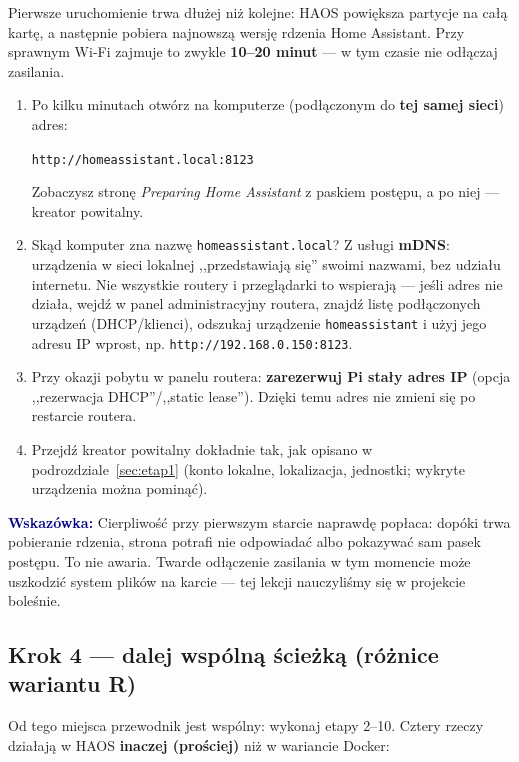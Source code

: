 \documentclass[11pt,a4paper]{article}
\newcommand{\wskazowka}[1]{\par\medskip\noindent\textcolor{navy}{\textbf{Wskazówka:}} #1\par\medskip}
\begin{document}
Pierwsze uruchomienie trwa dłużej niż kolejne: HAOS powiększa partycje na całą kartę, a następnie pobiera najnowszą wersję rdzenia Home Assistant. Przy sprawnym Wi-Fi zajmuje to zwykle \textbf{10--20 minut} --- w tym czasie nie odłączaj zasilania.

\begin{enumerate}
\item Po kilku minutach otwórz na komputerze (podłączonym do \textbf{tej samej sieci}) adres:
\begin{center}\Large\texttt{http://homeassistant.local:8123}\end{center}
Zobaczysz stronę \emph{Preparing Home Assistant} z paskiem postępu, a po niej --- kreator powitalny.
\item Skąd komputer zna nazwę \texttt{homeassistant.local}? Z usługi \textbf{mDNS}: urządzenia w sieci lokalnej ,,przedstawiają się'' swoimi nazwami, bez udziału internetu. Nie wszystkie routery i przeglądarki to wspierają --- jeśli adres nie działa, wejdź w panel administracyjny routera, znajdź listę podłączonych urządzeń (DHCP/klienci), odszukaj urządzenie \texttt{homeassistant} i użyj jego adresu IP wprost, np. \texttt{http://192.168.0.150:8123}.
\item Przy okazji pobytu w panelu routera: \textbf{zarezerwuj Pi stały adres IP} (opcja ,,rezerwacja DHCP''/,,static lease''). Dzięki temu adres nie zmieni się po restarcie routera.
\item Przejdź kreator powitalny dokładnie tak, jak opisano w podrozdziale~\ref{sec:etap1} (konto lokalne, lokalizacja, jednostki; wykryte urządzenia można pominąć).
\end{enumerate}

\wskazowka{Cierpliwość przy pierwszym starcie naprawdę popłaca: dopóki trwa pobieranie rdzenia, strona potrafi nie odpowiadać albo pokazywać sam pasek postępu. To nie awaria. Twarde odłączenie zasilania w tym momencie może uszkodzić system plików na karcie --- tej lekcji nauczyliśmy się w projekcie boleśnie.}

\subsection{Krok 4 --- dalej wspólną ścieżką (różnice wariantu R)}
\label{sec:rpi-dalej}

Od tego miejsca przewodnik jest wspólny: wykonaj etapy 2--10. Cztery rzeczy działają w HAOS \textbf{inaczej (prościej)} niż w wariancie Docker:
\end{document}
